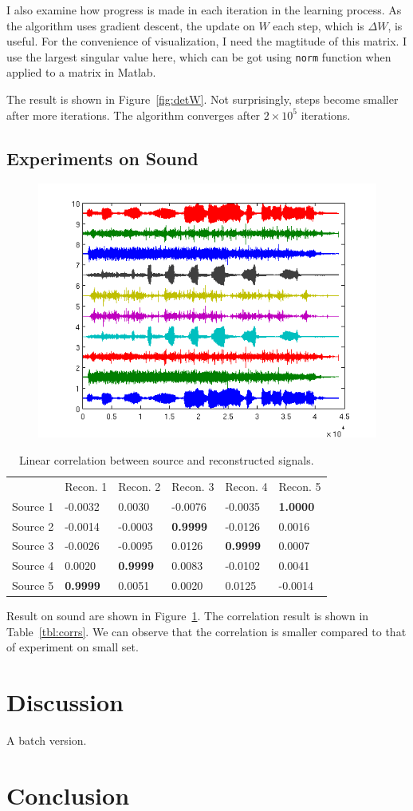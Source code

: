 \documentclass[10pt]{article}
\begin{document}
I also examine how progress is made in each iteration in the learning
process. As the algorithm uses gradient descent, the update on $W$ each
step, which is $\Delta W$, is useful. For the convenience of visualization,
I need the magtitude of this matrix. I use the largest singular value here,
which can be got using \texttt{norm} function when applied to a matrix in
Matlab.

The result is shown in Figure~\ref{fig:detW}. Not surprisingly, steps
become smaller after more iterations. The algorithm converges after $2
\times 10^5$ iterations.

\subsection{Experiments on Sound}

\begin{figure}
\centering
\includegraphics[width=.8\textwidth]{soundfull.png}
\caption{}
\label{fig:sound}
\end{figure}

\begin{table}
\centering
\begin{tabular}{ | l l l l l l | }
\hline
& Recon. 1& Recon. 2& Recon. 3& Recon. 4& Recon. 5\\
Source 1 &-0.0032& 0.0030&-0.0076&-0.0035& \textbf{1.0000}\\
Source 2 &-0.0014&-0.0003& \textbf{0.9999}&-0.0126& 0.0016\\
Source 3 &-0.0026&-0.0095& 0.0126& \textbf{0.9999}& 0.0007\\
Source 4 &0.0020& \textbf{0.9999}& 0.0083&-0.0102& 0.0041\\
Source 5 &\textbf{0.9999}& 0.0051& 0.0020& 0.0125&-0.0014\\
\hline
\end{tabular}
\caption{Linear correlation between source and reconstructed signals.}
\label{tbl:corrsf}
\end{table}

Result on sound are shown in Figure~\ref{fig:sound}. The correlation result
is shown in Table~\ref{tbl:corrs}. We can observe that the correlation is
smaller compared to that of experiment on small set.

\section{Discussion}

A batch version.

\section{Conclusion}
\end{document}
